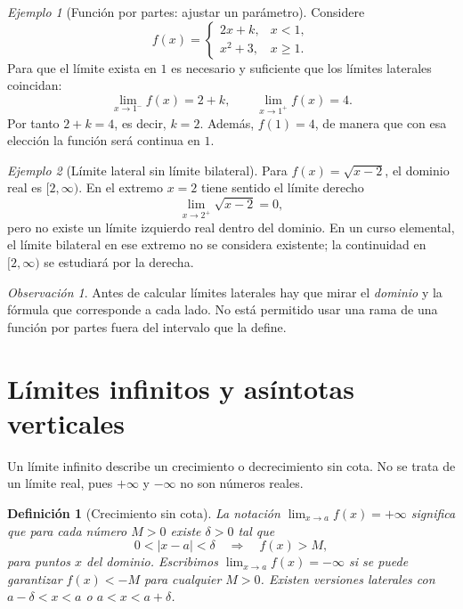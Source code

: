 \documentclass[12pt]{article}
\newtheorem{definicion}{Definición}[section]
\theoremstyle{remark}
\newtheorem{observacion}{Observación}
\newtheorem{ejemplo}{Ejemplo}
\begin{document}
\begin{ejemplo}[Función por partes: ajustar un parámetro]
Considere
\[
 f(x)=\begin{cases}2x+k,&x<1,\\x^2+3,&x\ge1.\end{cases}
\]
Para que el límite exista en $1$ es necesario y suficiente que los límites laterales coincidan:
\[
 \lim_{x\to1^-}f(x)=2+k,\qquad
 \lim_{x\to1^+}f(x)=4.
\]
Por tanto $2+k=4$, es decir, $\boxed{k=2}$. Además, $f(1)=4$, de manera que con esa elección la función será continua en $1$.
\end{ejemplo}

\begin{ejemplo}[Límite lateral sin límite bilateral]
Para $f(x)=\sqrt{x-2}$, el dominio real es $[2,\infty)$. En el extremo $x=2$ tiene sentido el límite derecho
\[
 \lim_{x\to2^+}\sqrt{x-2}=0,
\]
pero no existe un límite izquierdo real dentro del dominio. En un curso elemental, el límite bilateral en ese extremo no se considera existente; la continuidad en $[2,\infty)$ se estudiará por la derecha.
\end{ejemplo}

\begin{observacion}
Antes de calcular límites laterales hay que mirar el \emph{dominio} y la fórmula que corresponde a cada lado. No está permitido usar una rama de una función por partes fuera del intervalo que la define.
\end{observacion}

\section{Límites infinitos y asíntotas verticales}
Un límite infinito describe un crecimiento o decrecimiento sin cota. No se trata de un límite real, pues $+\infty$ y $-\infty$ no son números reales.

\begin{definicion}[Crecimiento sin cota]
La notación $\lim_{x\to a}f(x)=+\infty$ significa que para cada número $M>0$ existe $\delta>0$ tal que
\[
 0<|x-a|<\delta\quad\Longrightarrow\quad f(x)>M,
\]
para puntos $x$ del dominio. Escribimos $\lim_{x\to a}f(x)=-\infty$ si se puede garantizar $f(x)<-M$ para cualquier $M>0$. Existen versiones laterales con $a-\delta<x<a$ o $a<x<a+\delta$.
\end{definicion}
\end{document}
